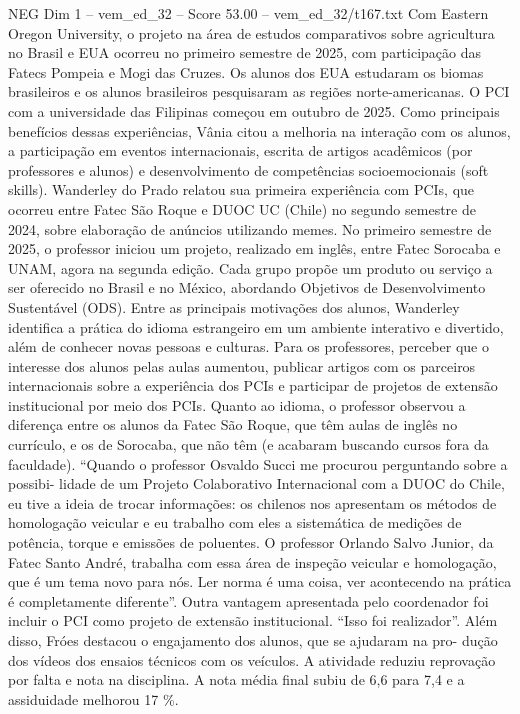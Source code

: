\begin{textsample}{NEG Dim 1 – vem\_ed\_32 – Score 53.00 – vem\_ed\_32/t167.txt}
Com Eastern Oregon University, o projeto na área de estudos comparativos sobre agricultura no Brasil e EUA ocorreu no primeiro semestre de 2025, com participação das Fatecs Pompeia e Mogi das Cruzes.
Os alunos dos EUA estudaram os biomas brasileiros e os alunos brasileiros pesquisaram as regiões norte-americanas.
O PCI com a universidade das Filipinas começou em outubro de 2025.
Como principais benefícios dessas experiências, Vânia citou a melhoria na interação com os alunos, a participação em eventos internacionais, escrita de artigos acadêmicos (por professores e alunos) e desenvolvimento de competências socioemocionais (soft skills).
Wanderley do Prado relatou sua primeira experiência com PCIs, que ocorreu entre Fatec São Roque e DUOC UC (Chile) no segundo semestre de 2024, sobre elaboração de anúncios utilizando memes.
No primeiro semestre de 2025, o professor iniciou um projeto, realizado em inglês, entre Fatec Sorocaba e UNAM, agora na segunda edição.
Cada grupo propõe um produto ou serviço a ser oferecido no Brasil e no México, abordando Objetivos de Desenvolvimento Sustentável (ODS).
Entre as principais motivações dos alunos, Wanderley identifica a prática do idioma estrangeiro em um ambiente interativo e divertido, além de conhecer novas pessoas e culturas.
Para os professores, perceber que o interesse dos alunos pelas aulas aumentou, publicar artigos com os parceiros internacionais sobre a experiência dos PCIs e participar de projetos de extensão institucional por meio dos PCIs.
Quanto ao idioma, o professor observou a diferença entre os alunos da Fatec São Roque, que têm aulas de inglês no currículo, e os de Sorocaba, que não têm (e acabaram buscando cursos fora da faculdade). “Quando o professor Osvaldo Succi me procurou perguntando sobre a possibi- lidade de um Projeto Colaborativo Internacional com a DUOC do Chile, eu tive a ideia de trocar informações: os chilenos nos apresentam os métodos de homologação veicular e eu trabalho com eles a sistemática de medições de potência, torque e emissões de poluentes.
O professor Orlando Salvo Junior, da Fatec Santo André, trabalha com essa área de inspeção veicular e homologação, que é um tema novo para nós.
Ler norma é uma coisa, ver acontecendo na prática é completamente diferente”.
Outra vantagem apresentada pelo coordenador foi incluir o PCI como projeto de extensão institucional. “Isso foi realizador”.
Além disso, Fróes destacou o engajamento dos alunos, que se ajudaram na pro- dução dos vídeos dos ensaios técnicos com os veículos.
A atividade reduziu reprovação por falta e nota na disciplina.
A nota média final subiu de 6,6 para 7,4 e a assiduidade melhorou 17 \%.

\end{textsample}
